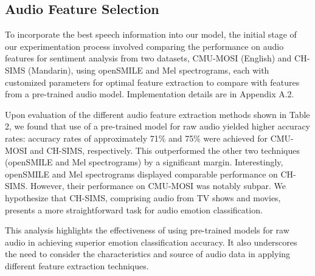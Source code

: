 \documentclass[11pt]{article}
\begin{document}
\subsection{Audio Feature Selection}
To incorporate the best speech information into our model, the initial stage of our experimentation process involved comparing the performance on audio features for sentiment analysis from two datasets, CMU-MOSI (English) and CH-SIMS (Mandarin), using openSMILE and Mel spectrograms, each with customized parameters for optimal feature extraction to compare with features from a pre-trained audio model. Implementation details are in Appendix A.2.

Upon evaluation of the different audio feature extraction methods shown in Table 2, we found that use of a pre-trained model for raw audio yielded higher accuracy rates:  accuracy rates of approximately 71\% and 75\% were achieved for CMU-MOSI and CH-SIMS, respectively. This outperformed the other two techniques (openSMILE and Mel spectrograms) by a significant margin. Interestingly, openSMILE and Mel spectrograms displayed comparable performance on CH-SIMS. However, their performance on CMU-MOSI was notably subpar. We hypothesize that CH-SIMS, comprising audio from TV shows and movies, presents a more straightforward task for audio emotion classification.

This analysis highlights the effectiveness of using pre-trained models for raw audio in achieving superior emotion classification accuracy. It also underscores the need to consider the characteristics and source of audio data in applying different feature extraction techniques.
\end{document}
